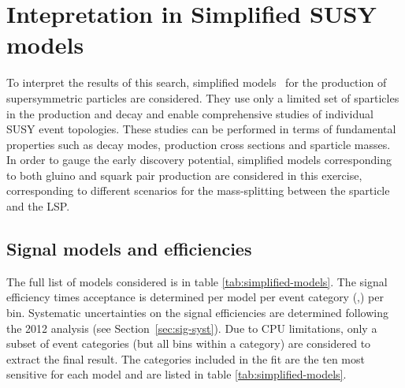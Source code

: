 \section{Intepretation in Simplified SUSY models}
\label{sec:susy}
To interpret the results of this search, simplified
models~\cite{Alwall:2008ag,Alwall:2008va,sms} for the production of supersymmetric particles are considered. 
They use only a limited set of sparticles in the production and
decay and enable comprehensive studies of individual SUSY event
topologies. These studies can be performed in terms of
fundamental properties such as decay modes, production cross sections and sparticle masses. 
In order to gauge the early discovery potential, simplified models corresponding to both gluino and squark pair production 
are considered in this exercise, corresponding to different scenarios for the mass-splitting between the sparticle and the LSP. 

\subsection{Signal models and efficiencies}
\label{subsec:susy_models}

The full list of models considered is in table \ref{tab:simplified-models}. 
The signal efficiency times acceptance is determined per model per event
category (\njet,\nb) per \HT bin. 
Systematic uncertainties on the signal efficiencies are determined 
following the 2012 analysis (see Section~\ref{sec:sig-syst}). Due to CPU
limitations, only a subset of event categories (but all \scalht bins
within a category) are considered to extract the final result. 
The categories included in the fit are the ten most sensitive 
for each model and are listed in table \ref{tab:simplified-models}. 

